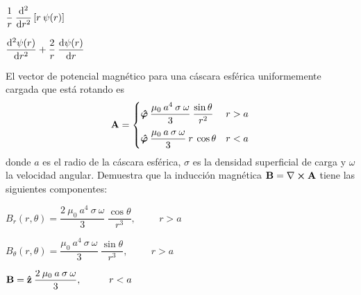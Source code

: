 \documentclass[12pt]{article}
\begin{document}
\begin{milista}
\begin{milista}
\item $\displaystyle \dfrac{1}{r} \: \dv[2]{r} \left[ r \: \psi(r) \right]$
\item $\displaystyle\dv[2]{\psi(r)}{r} + \dfrac{2}{r} \: \dv{\psi(r)}{r}$ 
\end{milista}
\item El vector de potencial magnético para una cáscara esférica uniformemente cargada que está rotando es
\begin{align*}
\vb{A} = \begin{cases}
\vu*{\varphi} \: \dfrac{\mu_{0} \: a^{4} \: \sigma \: \omega}{3} \: \dfrac{\sin \theta}{r^{2}} & r > a \\[1em]
\vu*{\varphi} \: \dfrac{\mu_{0} \: a \: \sigma \: \omega}{3} \: r \: \cos \theta & r < a
\end{cases}
\end{align*}
donde $a$ es el radio de la cáscara esférica, $\sigma$ es la densidad superficial de carga y $\omega$ la velocidad angular. Demuestra que la inducción magnética $\vb{B} = \vb{\nabla} \cp \vb{A}$ tiene las siguientes componentes:
\begin{milista}\itemsep4pt
\item $B_{r} (r, \theta) = \dfrac{2 \: \mu_{0} \: a^{4} \: \sigma \: \omega}{3} \: \dfrac{\cos \theta}{r^{3}}, \hspace{1cm} r>a$
\item $B_{\theta} (r, \theta) = \dfrac{\mu_{0} \: a^{4} \: \sigma \: \omega}{3} \: \dfrac{\sin \theta}{r^{3}}, \hspace{1cm} r>a$
\item $\vb{B} = \vu{z} \: \dfrac{2 \: \mu_{0} \: a \: \sigma \: \omega}{3}, \hspace{1cm} r < a$
\end{milista}
\end{milista}
\end{document}
